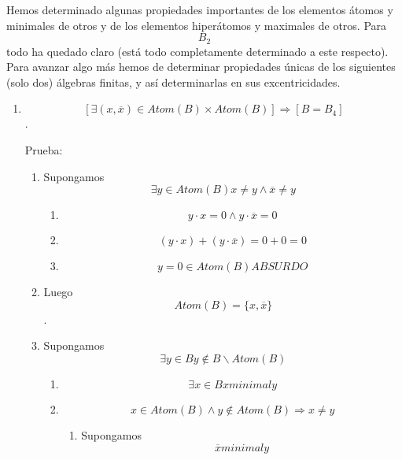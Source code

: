 \begin{enumerate}
\begin{enumerate}
    Hemos determinado algunas propiedades importantes de los elementos
    átomos y minimales de otros y de los elementos hiperátomos y
    maximales de otros. Para \[B_{2}\] todo ha quedado claro (está todo
    completamente determinado a este respecto). Para avanzar algo más
    hemos de determinar propiedades únicas de los siguientes (solo dos)
    álgebras finitas, y así determinarlas en sus excentricidades.

    \begin{enumerate}
    \def\labelenumiii{\arabic{enumiii}.}
    \setcounter{enumiii}{82}
    \item
      \[\left\lbrack {\exists{\left( {x,\overline{x}} \right) \in \mathit{Atom}}{{(B)} \times \mathit{Atom}}{(B)}} \right\rbrack\Rightarrow\left\lbrack {B = B_{4}} \right\rbrack\].

      Prueba:

      \begin{enumerate}
      \def\labelenumiv{\arabic{enumiv}.}
      \item
        Supongamos
        \[\exists{y \in \mathit{Atom}}{(B)}{{x \neq {y \land \overline{x}}} \neq y}\]

        \begin{enumerate}
        \def\labelenumv{\arabic{enumv}.}
        \tightlist
        \item
          \[{{y \cdot x} = {{0 \land y} \cdot \overline{x}}} = 0\]
        \item
          \[{{{({y \cdot x})} + {({y \cdot \overline{x}})}} = {0 + 0}} = 0\]
        \item
          \[{{y = 0} \in \mathit{Atom}}{(B)}\mathit{ABSURDO}\]
        \end{enumerate}
      \item
        Luego \[\mathit{Atom}{{(B)} = {\{{x,\overline{x}}\}}}\].
      \item
        Supongamos
        \[\exists{y \in B}{y \notin {B \smallsetminus {\mathit{Atom}{(B)}}}}\]

        \begin{enumerate}
        \def\labelenumv{\arabic{enumv}.}
        \item
          \[\exists{x \in B}x\mathsf{\mathit{minimal}}y\]
        \item
          \[{x \in \mathit{Atom}}{{{(B)} \land y} \notin \mathit{Atom}}{(B)}\Rightarrow{x \neq y}\]

          \begin{enumerate}
          \def\labelenumvi{\arabic{enumvi}.}
          \item
            Supongamos \[\overline{x}\mathsf{\mathit{minimal}}y\]


\end{enumerate}
\end{enumerate}
\end{enumerate}
\end{enumerate}
\end{enumerate}
\end{enumerate}
